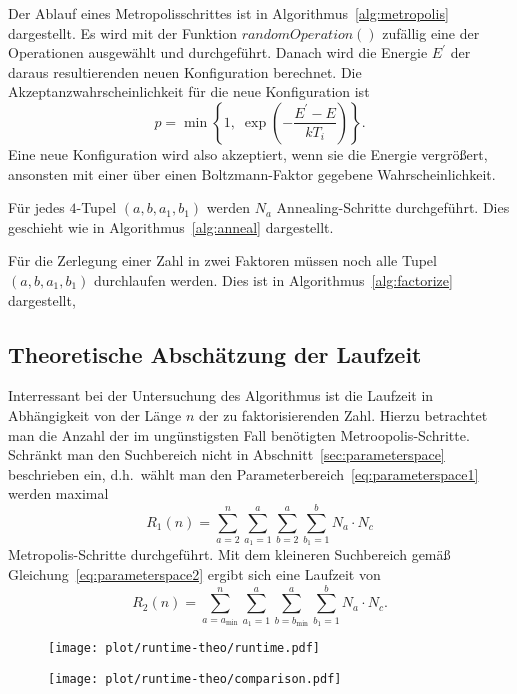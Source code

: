 Der Ablauf eines Metropolisschrittes ist in Algorithmus~\ref{alg:metropolis} dargestellt. Es wird mit der Funktion $\mathrm{\textit{randomOperation}}\left(\right)$ zufällig eine der Operationen ausgewählt und durchgeführt. Danach wird die Energie $E^\prime$ der daraus resultierenden neuen Konfiguration berechnet. Die Akzeptanzwahrscheinlichkeit für die neue Konfiguration ist
\begin{equation*}
		p=\min\left\{1,\;\exp\left(-\frac{E^\prime-E}{k T_i}\right)\right\}.
\end{equation*}
Eine neue Konfiguration wird also akzeptiert, wenn sie die Energie vergrößert, ansonsten mit einer über einen Boltzmann-Faktor gegebene Wahrscheinlichkeit. \\

\FloatBarrier{}

Für jedes $4$-Tupel $\left(a,b,a_1,b_1\right)$ werden $N_a$ Annealing-Schritte durchgeführt. Dies geschieht wie in Algorithmus~\ref{alg:anneal} dargestellt.

\FloatBarrier{}

Für die Zerlegung einer Zahl in zwei Faktoren müssen noch alle Tupel $\left(a,b,a_1,b_1\right)$ durchlaufen werden. Dies ist in Algorithmus~\ref{alg:factorize} dargestellt,

\FloatBarrier{}

\subsection{Theoretische Abschätzung der Laufzeit}\label{sec:runtime-theo}
Interressant bei der Untersuchung des Algorithmus ist die Laufzeit in Abhängigkeit von der Länge $n$ der zu faktorisierenden Zahl. Hierzu betrachtet man die Anzahl der im ungünstigsten Fall benötigten Metroopolis-Schritte. \\
Schränkt man den Suchbereich nicht in Abschnitt~\ref{sec:parameterspace} beschrieben ein, d.h.\ wählt man den Parameterbereich~\ref{eq:parameterspace1} werden maximal
\begin{equation*}
		R_1\left(n\right)=\sum\limits_{a=2}^{n}\sum\limits_{a_1=1}^{a}\sum\limits_{b=2}^{a}\sum\limits_{b_1=1}^{b}N_a\cdot N_c
\end{equation*}
Metropolis-Schritte durchgeführt. Mit dem kleineren Suchbereich gemäß Gleichung~\ref{eq:parameterspace2} ergibt sich eine Laufzeit von
\begin{equation*}
		R_2\left(n\right)=\sum\limits_{a=a_\mathrm{min}}^{n}\sum\limits_{a_1=1}^{a}\sum\limits_{b=b_\mathrm{min}}^{a}\sum\limits_{b_1=1}^{b}N_a\cdot N_c.
\end{equation*}
\begin{figure}[ht]
		\centering
		\begin{minipage}[ht]{0.49\linewidth}
				\centering
				\texttt{[image: plot/runtime-theo/runtime.pdf]}
		\end{minipage}
		\begin{minipage}[ht]{0.49\linewidth}
				\centering
				\texttt{[image: plot/runtime-theo/comparison.pdf]}
		\end{minipage}
\end{figure}
\FloatBarrier{}
